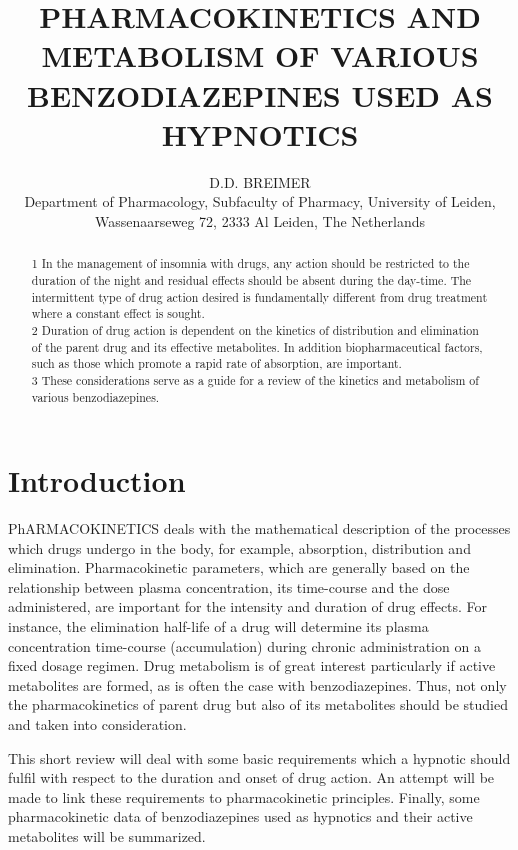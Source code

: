 \documentclass[10pt]{article}
\title{PHARMACOKINETICS AND METABOLISM OF VARIOUS BENZODIAZEPINES USED AS HYPNOTICS }
\author{D.D. BREIMER\\
Department of Pharmacology, Subfaculty of Pharmacy, University of Leiden,\\
Wassenaarseweg 72, 2333 Al Leiden, The Netherlands}
\date{}
\begin{document}
\maketitle


\begin{abstract}
1 In the management of insomnia with drugs, any action should be restricted to the duration of the night and residual effects should be absent during the day-time. The intermittent type of drug action desired is fundamentally different from drug treatment where a constant effect is sought.\\
2 Duration of drug action is dependent on the kinetics of distribution and elimination of the parent drug and its effective metabolites. In addition biopharmaceutical factors, such as those which promote a rapid rate of absorption, are important.\\
3 These considerations serve as a guide for a review of the kinetics and metabolism of various benzodiazepines.
\end{abstract}

\section*{Introduction}
PhARMACOKINETICS deals with the mathematical description of the processes which drugs undergo in the body, for example, absorption, distribution and elimination. Pharmacokinetic parameters, which are generally based on the relationship between plasma concentration, its time-course and the dose administered, are important for the intensity and duration of drug effects. For instance, the elimination half-life of a drug will determine its plasma concentration time-course (accumulation) during chronic administration on a fixed dosage regimen. Drug metabolism is of great interest particularly if active metabolites are formed, as is often the case with benzodiazepines. Thus, not only the pharmacokinetics of parent drug but also of its metabolites should be studied and taken into consideration.

This short review will deal with some basic requirements which a hypnotic should fulfil with respect to the duration and onset of drug action. An attempt will be made to link these requirements to pharmacokinetic principles. Finally, some pharmacokinetic data of benzodiazepines used as hypnotics and their active metabolites will be summarized.
\end{document}
